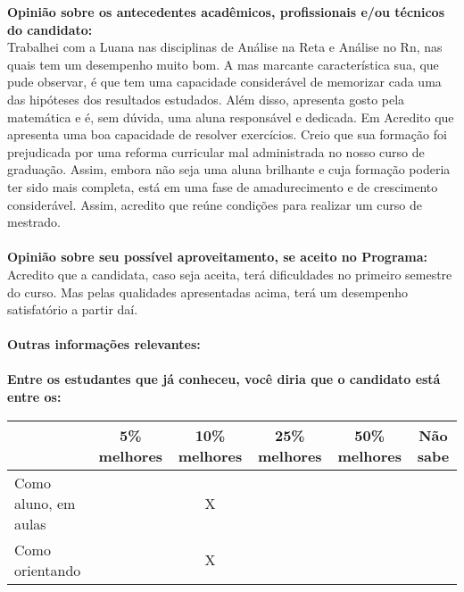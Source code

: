 \documentclass[11pt]{article}
\begin{document}
\textbf{Opinião sobre os antecedentes acadêmicos, profissionais e/ou técnicos do candidato:}
\\Trabalhei com a Luana nas disciplinas de Análise na Reta e Análise no Rn, nas quais tem um desempenho muito bom. A mas marcante característica sua, que pude observar, é que tem uma capacidade considerável de memorizar cada uma das hipóteses dos resultados estudados. Além disso, apresenta gosto pela matemática e é, sem dúvida, uma aluna responsável e dedicada. Em Acredito que apresenta uma boa capacidade de resolver exercícios. Creio que sua formação foi prejudicada por uma reforma curricular mal administrada no nosso curso de graduação.
Assim, embora não seja uma aluna brilhante e cuja formação poderia ter sido mais completa, está em uma fase de amadurecimento e de crescimento considerável. Assim, acredito que reúne condições para realizar um curso de mestrado.  \\
\\
\textbf{Opinião sobre seu possível aproveitamento, se aceito no Programa:}
\\Acredito que a candidata, caso seja aceita, terá dificuldades no primeiro semestre do curso. Mas pelas qualidades apresentadas acima, terá um desempenho satisfatório a partir daí.\\ 
\\
\textbf{Outras informações relevantes:} \\
\\[0.3cm]
\textbf{Entre os estudantes que já conheceu, você diria que o candidato está entre os:}
\\
\begin{tabular}{|l|c|c|c|c|c|}
\hline
 & 5\% melhores & 10\% melhores & 25\% melhores & 50\% melhores & Não sabe \\
\hline
Como aluno, em aulas &  & X &  &  & \\
\hline
Como orientando &  & X &  &  & \\
\hline
\end{tabular}
\end{document}
